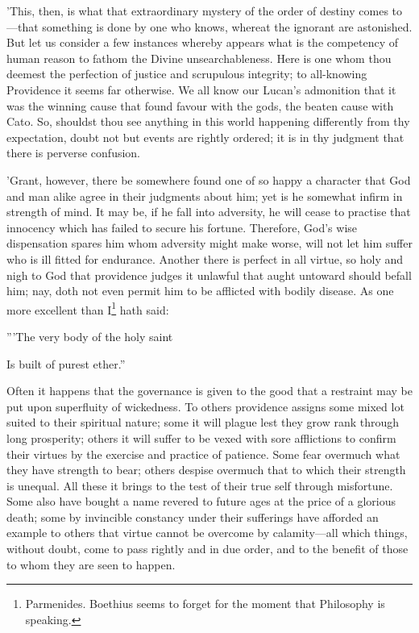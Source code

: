 'This, then, is what that extraordinary mystery of the order of destiny
comes to—that something is done by one who knows, whereat the ignorant
are astonished. But let us consider a few instances whereby appears what
is the competency of human reason to fathom the Divine unsearchableness.
Here is one whom thou deemest the perfection of justice and scrupulous
integrity; to all-knowing Providence it seems far otherwise. We all know
our Lucan's admonition that it was the winning cause that found favour
with the gods, the beaten cause with Cato. So, shouldst thou see
anything in this world happening differently from thy expectation, doubt
not but events are rightly ordered; it is in thy judgment that there is
perverse confusion.

'Grant, however, there be somewhere found one of so happy a character
that God and man alike agree in their judgments about him; yet is he
somewhat infirm in strength of mind. It may be, if he fall into
adversity, he will cease to practise that innocency which has failed to
secure his fortune. Therefore, God's wise dispensation spares him whom
adversity might make worse, will not let him suffer who is ill fitted
for endurance. Another there is perfect in all virtue, so holy and nigh
to God that providence judges it unlawful that aught untoward should
befall him; nay, doth not even permit him to be afflicted with bodily
disease. As one more excellent than I\footnote{Parmenides. Boethius seems to forget for the moment that
Philosophy is speaking.} hath said:

'''The very body of the holy saint

Is built of purest ether.''

Often it happens that the governance is given to the good that a
restraint may be put upon superfluity of wickedness. To others
providence assigns some mixed lot suited to their spiritual nature; some
it will plague lest they grow rank through long prosperity; others it
will suffer to be vexed with sore afflictions to confirm their virtues
by the exercise and practice of patience. Some fear overmuch what they
have strength to bear; others despise overmuch that to which their
strength is unequal. All these it brings to the test of their true self
through misfortune. Some also have bought a name revered to future ages
at the price of a glorious death; some by invincible constancy under
their sufferings have afforded an example to others that virtue cannot
be overcome by calamity—all which things, without doubt, come to pass
rightly and in due order, and to the benefit of those to whom they are
seen to happen.


